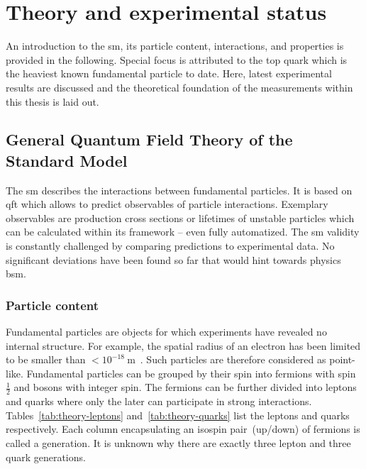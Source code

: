 \chapter{Theory and experimental status}

An introduction to the \gls{sm}, its particle content, interactions, and properties is provided in the following. Special focus is attributed to the top quark which is the heaviest known fundamental particle to date. Here, latest experimental results are discussed and the theoretical foundation of the measurements within this thesis is laid out.


\section{General Quantum Field Theory of the Standard Model}

The \gls{sm} describes the interactions between fundamental particles. It is based on \gls{qft} which allows to predict observables of particle interactions. Exemplary observables are production cross sections or lifetimes of unstable particles which can be calculated within its framework -- even fully automatized. The \gls{sm} validity is constantly challenged by comparing predictions to experimental data. No significant deviations have been found so far that would hint towards physics \gls{bsm}.


\subsection{Particle content}

Fundamental particles are objects for which experiments have revealed no internal structure. For example, the spatial radius of an electron has been limited to be smaller than $<10^{-18}~\mathrm{m}$~\cite{PhysRevLett.97.030801}. Such particles are therefore considered as point-like. Fundamental particles can be grouped by their spin into fermions with spin~$\frac{1}{2}$ and bosons with integer spin. The fermions can be further divided into leptons and quarks where only the later can participate in strong interactions. Tables~\ref{tab:theory-leptons} and~\ref{tab:theory-quarks} list the leptons and quarks respectively. Each column encapsulating an isospin pair~(up/down) of fermions is called a generation. It is unknown why there are exactly three lepton and three quark generations.

